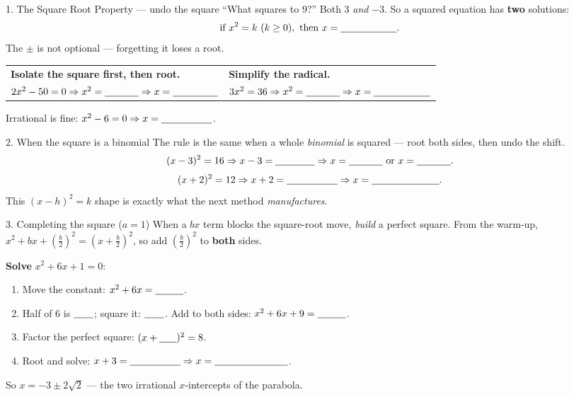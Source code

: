 \documentclass[10pt]{article}
\begin{document}
\boxguard[22]
\begin{notesbox}{1. The Square Root Property --- undo the square}
``What squares to $9$?'' Both $3$ \emph{and} $-3$. So a squared equation has \textbf{two} solutions:
\[ \text{if } x^2=k \ (k\ge0), \text{ then } x=\blank{2.0cm}. \]
The $\pm$ is not optional --- forgetting it loses a root.
\begin{center}
\renewcommand{\arraystretch}{1.5}
\begin{tabularx}{\linewidth}{@{}X X@{}}
\textbf{Isolate the square first, then root.} & \textbf{Simplify the radical.} \\
$2x^2-50=0 \Rightarrow x^2=\blank{1.2cm} \Rightarrow x=\blank{1.6cm}$ &
$3x^2=36 \Rightarrow x^2=\blank{1.2cm} \Rightarrow x=\blank{2.0cm}$ \\
\end{tabularx}
\end{center}
Irrational is fine: $x^2-6=0 \Rightarrow x=\blank{1.8cm}$.

\vspace{3pt}
\end{notesbox}

\begin{notesbox}{2. When the square is a binomial}
The rule is the same when a whole \emph{binomial} is squared --- root both sides, then undo the shift.
\[ (x-3)^2=16 \Rightarrow x-3=\blank{1.4cm} \Rightarrow x=\blank{1.2cm} \ \text{or} \ x=\blank{1.2cm}. \]
\[ (x+2)^2=12 \Rightarrow x+2=\blank{1.8cm} \Rightarrow x=\blank{2.4cm}. \]
This $(x-h)^2=k$ shape is exactly what the next method \emph{manufactures}.
\end{notesbox}

\begin{notesbox}{3. Completing the square ($a=1$)}
When a $bx$ term blocks the square-root move, \emph{build} a perfect square. From the warm-up,
$x^2+bx+\left(\tfrac{b}{2}\right)^2=\left(x+\tfrac{b}{2}\right)^2$, so add $\left(\tfrac{b}{2}\right)^2$ to
\textbf{both} sides.
\smallskip

\textbf{Solve} $x^2+6x+1=0$:
\begin{enumerate}[leftmargin=1.7em, itemsep=2pt]
  \item Move the constant: $x^2+6x=\blank{1.0cm}$.
  \item Half of $6$ is $\blank{0.7cm}$; square it: $\blank{0.7cm}$. Add to both sides: $x^2+6x+9=\blank{1.0cm}$.
  \item Factor the perfect square: $(x+\blank{0.6cm})^2=8$.
  \item Root and solve: $x+3=\blank{1.8cm} \Rightarrow x=\blank{2.6cm}$.
\end{enumerate}
So $x=-3\pm2\sqrt2$ --- the two irrational $x$-intercepts of the parabola.
\end{notesbox}
\end{document}
